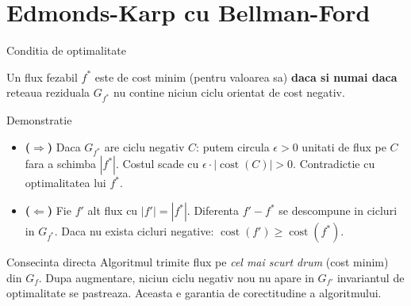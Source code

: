 ﻿\documentclass[9pt]{beamer}
\newcommand{\cost}{\operatorname{cost}}
\begin{document}
\section{Edmonds-Karp cu Bellman-Ford}

\begin{frame}[shrink]{Conditia de optimalitate}
  \begin{theorem}
    Un flux fezabil $f^*$ este de cost minim (pentru valoarea sa) \textbf{daca si numai daca}
    reteaua reziduala $G_{f^*}$ nu contine niciun ciclu orientat de cost negativ.
  \end{theorem}
  \begin{block}{Demonstratie}
    \begin{itemize}
      \item \textbf{($\Rightarrow$)} Daca $G_{f^*}$ are ciclu negativ $C$: putem circula
            $\epsilon>0$ unitati de flux pe $C$ fara a schimba $|f^*|$.
            Costul scade cu $\epsilon\cdot|\cost(C)|>0$. Contradictie cu optimalitatea lui $f^*$.
      \item \textbf{($\Leftarrow$)} Fie $f'$ alt flux cu $|f'|=|f^*|$.
            Diferenta $f'-f^*$ se descompune in cicluri in $G_{f^*}$.
            Daca nu exista cicluri negative: $\cost(f')\geq\cost(f^*)$.
    \end{itemize}
  \end{block}
  \begin{alertblock}{Consecinta directa}
    \footnotesize
    Algoritmul trimite flux pe \textit{cel mai scurt drum} (cost minim) din $G_f$. Dupa augmentare,
    niciun ciclu negativ nou nu apare in $G_{f'}$ \textemdash{} invariantul de optimalitate se pastreaza.
    Aceasta e garantia de corectitudine a algoritmului.
  \end{alertblock}
\end{frame}
\end{document}
